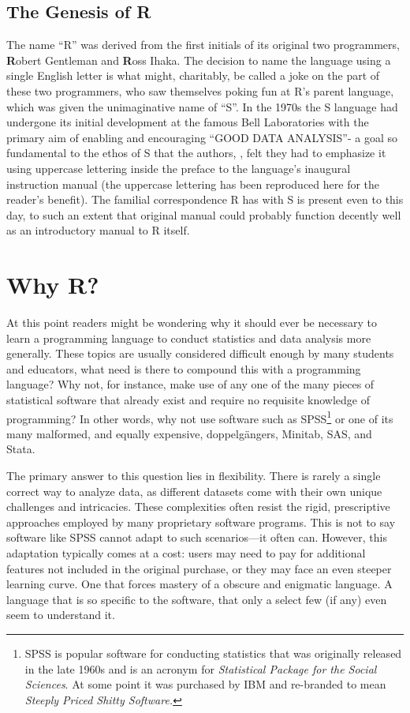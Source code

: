 \subsection{The Genesis of R}

The name ``R'' was derived from the first initials of its original two programmers, \textbf{R}obert Gentleman and \textbf{R}oss Ihaka.  The decision to name the language using a single English letter is what might, charitably, be called a joke on the part of these two programmers, who saw themselves poking fun at R's parent language, which was given the unimaginative name of ``S''. In the 1970s the S language had undergone its initial development at the famous Bell Laboratories with the primary aim of enabling and encouraging ``GOOD DATA ANALYSIS''- a goal so fundamental to the ethos of S that the authors, \textcite{Becker1984}, felt they had to emphasize it using uppercase lettering inside the preface to the language's inaugural instruction manual (the uppercase lettering has been reproduced here for the reader's benefit). The familial correspondence R has with S is present even to this day, to such an extent that \textcite{Becker1984} original manual could probably function decently well as an introductory manual to R itself.

\section{Why R?}

At this point readers might be wondering why it should ever be necessary to learn a programming language to conduct statistics and data analysis more generally. These topics are usually considered difficult enough by many students and educators, what need is there to compound this with a programming language? Why not, for instance, make use of any one of the many pieces of statistical software that already exist and require no requisite knowledge of programming? In other words, why not use software such as SPSS\footnote{SPSS is popular software for conducting statistics that was originally released in the late 1960s and is an acronym for \textit{Statistical Package for the Social Sciences}. At some point it was purchased by IBM and re-branded to mean \textit{Steeply Priced Shitty Software.}} or one of its many malformed, and equally expensive, doppelgängers, Minitab, SAS, and Stata.

The primary answer to this question lies in flexibility. There is rarely a single correct way to analyze data, as different datasets come with their own unique challenges and intricacies. These complexities often resist the rigid, prescriptive approaches employed by many proprietary software programs. This is not to say software like SPSS cannot adapt to such scenarios—it often can. However, this adaptation typically comes at a cost: users may need to pay for additional features not included in the original purchase, or they may face an even steeper learning curve. One that forces mastery of a obscure and enigmatic language. A language that is so specific to the software, that only a select few (if any) even seem to understand it.

